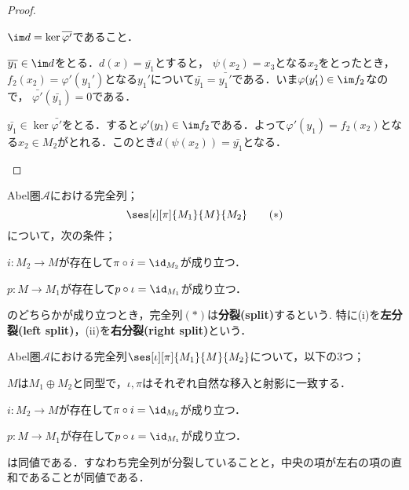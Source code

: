 \begin{proof}
\begin{step}
\begin{sakura}
			\item $\im d=\ker\bar{\varphi'}$であること．
			
			$\bar{y_1}\in\im d$をとる．$d(x)=\bar{y_1}$とすると， $\psi(x_2)=x_3$となる$x_2$をとったとき， $f_2(x_2)=\varphi'(y_1')$となる$y_1'$について$\bar{y_1}=\bar{y_1'}$である．いま$\varphi(y_1')\in\im f_2$なので， $\bar{\varphi'}(\bar{y_1})=0$である．
			
			$\bar{y_1}\in\ker\bar{\varphi'}$をとる．すると$\varphi'(y_1)\in\im f_2$である．よって$\varphi'(y_1)=f_2(x_2)$となる$x_2\in M_2$がとれる．このとき$d(\psi(x_2))=\bar{y_1}$となる．
		\end{sakura}
	\end{step}
\end{proof}

\begin{defi}[分裂完全列]
	Abel圏$\mathscr{A}$における完全列；
	\[\ses[\iota][\pi]{M_1}{M}{M_2}\tag{$\ast$}\]
	について，次の条件；
	\begin{sakura}
		\item $i:M_2\to M$が存在して$\pi\circ i=\id_{M_2}$が成り立つ．
		\item $p:M\to M_1$が存在して$p\circ\iota=\id_{M_1}$が成り立つ．
	\end{sakura}
	のどちらかが成り立つとき，完全列$(\ast)$は\textbf{分裂(split)}するという. 特に(i)を\textbf{左分裂(left split)}，(ii)を\textbf{右分裂(right split)}という．
\end{defi}

\begin{lem}[分裂補題]
	Abel圏$\mathscr{A}$における完全列$\ses[\iota][\pi]{M_1}{M}{M_2}$について，以下の3つ；
	\begin{sakura}
		\item $M$は$M_1\oplus M_2$と同型で，$\iota,\pi$はそれぞれ自然な移入と射影に一致する．
			
		\item $i:M_2\to M$が存在して$\pi\circ i=\id_{M_2}$が成り立つ．
		
		\item $p:M\to M_1$が存在して$p\circ\iota=\id_{M_1}$が成り立つ．
	\end{sakura}
	は同値である．すなわち完全列が分裂していることと，中央の項が左右の項の直和であることが同値である．
\end{lem}


